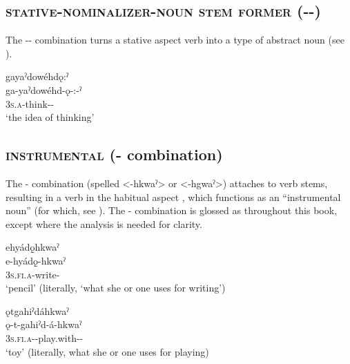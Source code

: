 \subsection{ \textsc{stative-nominalizer-noun stem former} ({\stative-\nominalizer-\nsf})} \label{[-ǫ-:-ˀ]}
The  \textsc{\stative-\nominalizer-\nsf} combination  turns a stative aspect verb into a type of abstract noun (see ).

\ea\label{ex:examplestatnom}
gayaˀdowéhdǫ:ˀ\\
\gll ga-yaˀdowéhd-ǫ-:-ˀ\\
 \textsc{3s.a}-think-\stat-\nominalizer{-\nsf}\\
\glt `the idea of thinking'
\z


\subsection{ \textsc{instrumental} ({\instrumental}-{\habitual} combination) } \label{[-hkwaˀ]}
The  {\instrumental}-{\habitual} combination (spelled <-hkwaˀ> or <-hgwaˀ>) attaches to verb stems, resulting in a verb in the habitual aspect , which functions as an “instrumental noun” (for which, see ). The  {\instrumental}-{\habitual} combination is glossed as  {\instrumental} throughout this book, except where the  analysis is needed for clarity.

\ea\label{ex:kwaex}
\ea ehyádǫ̱hkwaˀ\\
\gll e-hyádǫ̱-hkwaˀ\\
\textsc{3s.fi.a}-write-{\instrumental}\\
\glt ‘pencil’ (literally, ‘what she or one uses for writing’)\\


\ex ǫtgahiˀdáhkwaˀ \\
\gll ǫ-t-gahiˀd-á-hkwaˀ\\
\textsc{3s.fi.a}-{\semireflexive}-play.with-{\joinerA}-{\instrumental}\\
\glt ‘toy’ (literally, what she or one uses for playing)

